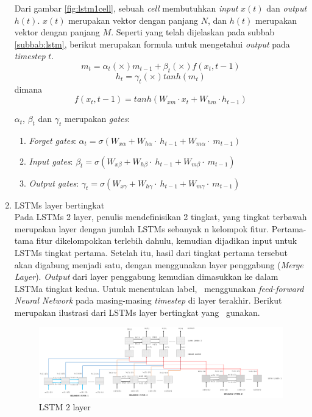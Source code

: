 \begin{enumerate}
	Dari gambar \ref{fig:lstm1cell}, sebuah \textit{cell} membutuhkan \textit{input} $ x(t) $ dan \textit{output} $ h(t) $. $ x(t) $ merupakan vektor dengan panjang $ N $, dan $ h(t) $ merupakan vektor dengan panjang $ M $. Seperti yang telah dijelaskan pada subbab \ref{subbab:lstm}, berikut merupakan formula untuk mengetahui \textit{output} pada \textit{timestep} $ t $.
	\begin{equation}\label{eq:lstmm}
	m_{t}=\alpha_{t} (\times) m_{t-1} + \beta_{t} (\times) f(x_{t},{t-1})
	\end{equation}
	\begin{equation}\label{eq:lstmh}
	h_{t}=\gamma_{t} (\times) tanh(m_{t})
	\end{equation}
	dimana
	\begin{equation}\label{eq:lstmx}
	f(x_{t},{t-1})=tanh(W_{xm} \cdot x_{t} + W_{hm} \cdot h_{t-1})
	\end{equation}
	
	$ \alpha_t $, $ \beta_t $ dan $ \gamma_t $ merupakan \textit{gates}:
	\begin{enumerate}
		\item \textit{Forget gates}: $ \alpha_{t}=\sigma(W_{x\alpha}+W_{h\alpha}\cdot~h_{t-1}+W_{m\alpha}\cdot~m_{t-1}) $
		\item \textit{Input gates}: $ \beta_{t}=\sigma(W_{x\beta}+W_{h\beta}\cdot~h_{t-1}+W_{m\beta}\cdot~m_{t-1}) $
		\item \textit{Output gates}: $ \gamma_{t}=\sigma(W_{x\gamma}+W_{h\gamma}\cdot~h_{t-1}+W_{m\gamma}\cdot~m_{t-1}) $
	\end{enumerate}

	\item LSTMs layer bertingkat\\
	Pada LSTMs 2 layer, penulis mendefinisikan 2 tingkat, yang tingkat terbawah merupakan layer dengan jumlah LSTMs sebanyak n kelompok fitur. Pertama-tama fitur dikelompokkan terlebih dahulu, kemudian dijadikan input untuk LSTMs tingkat pertama. Setelah itu, hasil dari tingkat pertama tersebut akan digabung menjadi satu, dengan menggunakan layer penggabung (\textit{Merge Layer}). \textit{Output} dari layer penggabung kemudian dimasukkan ke dalam LSTMa tingkat kedua. Untuk menentukan label, \saya~menggunakan \textit{feed-forward Neural Network} pada masing-masing \textit{timestep} di layer terakhir. Berikut merupakan ilustrasi dari LSTMs layer bertingkat yang \saya~gunakan.
	
	\begin{figure}
		\centering
		\includegraphics[width=1.0\linewidth]{images/lstm2}
		\caption{LSTM 2 layer}
		\label{fig:lstm2}
	\end{figure}


\end{enumerate}
